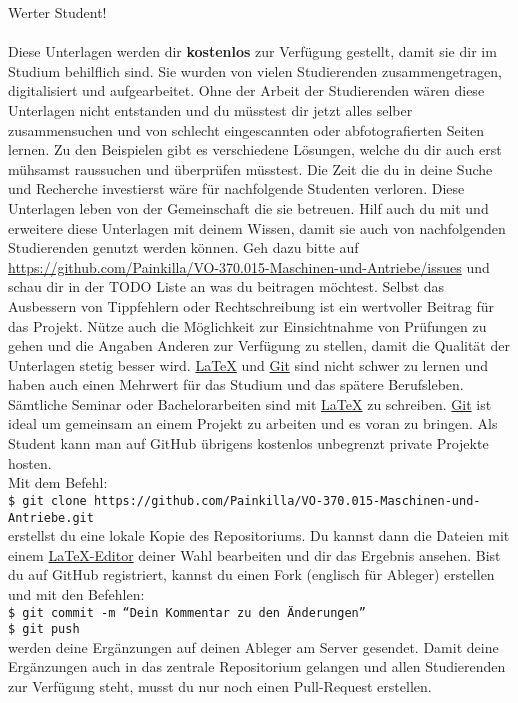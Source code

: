 \newpage %
	Werter Student!\\
	\\
	Diese Unterlagen werden dir \textbf{kostenlos} zur Verfügung gestellt, damit sie dir im Studium behilflich sind.
	Sie wurden von vielen Studierenden zusammengetragen, digitalisiert und aufgearbeitet.
	Ohne der Arbeit der Studierenden wären diese Unterlagen nicht entstanden und du müsstest dir jetzt alles selber zusammensuchen und von schlecht eingescannten oder abfotografierten Seiten lernen.
	Zu den Beispielen gibt es verschiedene Lösungen, welche du dir auch erst mühsamst raussuchen und überprüfen müsstest.
	Die Zeit die du in deine Suche und Recherche investierst wäre für nachfolgende Studenten verloren. Diese Unterlagen leben von der Gemeinschaft die sie betreuen.
	Hilf auch du mit und erweitere diese Unterlagen mit deinem Wissen, damit sie auch von nachfolgenden Studierenden genutzt werden können.
	Geh dazu bitte auf \href{https://github.com/Painkilla/VO-370.015-Maschinen-und-Antriebe/issues}{https://github.com/Painkilla/VO-370.015-Maschinen-und-Antriebe/issues} und schau dir in der TODO Liste an was du beitragen möchtest.
	Selbst das Ausbessern von Tippfehlern oder Rechtschreibung ist ein wertvoller Beitrag für das Projekt. Nütze auch die Möglichkeit zur Einsichtnahme von Prüfungen zu gehen und die Angaben Anderen zur Verfügung zu stellen, damit die Qualität der Unterlagen stetig besser wird.
	\href{https://www.latex-project.org/get/}{\LaTeX} und \href{https://git-scm.com/downloads}{Git} sind nicht schwer zu lernen und haben auch einen Mehrwert für das Studium und das spätere Berufsleben.
	Sämtliche Seminar oder Bachelorarbeiten sind mit \href{https://www.latex-project.org/get/}{\LaTeX} zu schreiben. \href{https://git-scm.com/downloads}{Git} ist ideal um gemeinsam an einem Projekt zu arbeiten und es voran zu bringen.
	Als Student kann man auf GitHub übrigens kostenlos unbegrenzt private Projekte hosten.\\
	Mit dem Befehl:\\
	\texttt{\$ git clone https://github.com/Painkilla/VO-370.015-Maschinen-und-Antriebe.git}\\
	erstellst du eine lokale Kopie des Repositoriums. Du kannst dann die Dateien mit einem \href{https://www.latex-project.org/get/}{\LaTeX-Editor} deiner Wahl bearbeiten und dir das Ergebnis ansehen.
	Bist du auf GitHub registriert, kannst du einen Fork (englisch für Ableger) erstellen und mit den Befehlen:\\
	\texttt{\$ git commit -m ``Dein Kommentar zu den Änderungen''}\\
	\texttt{\$ git push}\\
	werden deine Ergänzungen auf deinen Ableger am Server gesendet. Damit deine Ergänzungen auch in das zentrale Repositorium gelangen und allen Studierenden zur Verfügung steht, musst du nur noch einen Pull-Request erstellen.
	\newpage